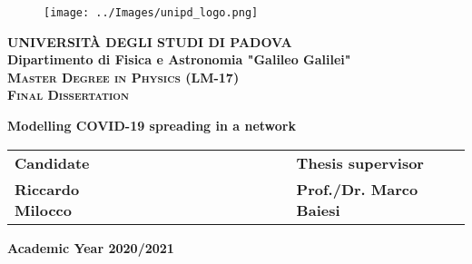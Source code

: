\documentclass[a4paper,11pt,twoside]{report} %
\makeatletter
\renewcommand\tableofcontents{%
    \section*{\Huge{\contentsname}}%
    \@starttoc{toc}%
}
\makeatother
\begin{document}

\begin{titlepage}
\vspace{5mm}
\begin{figure}[hbtp]
\centering
\texttt{[image: ../Images/unipd\_logo.png]}
\end{figure}
\vspace{5mm}
\begin{center}
{{\huge{\textsc{\bf UNIVERSIT\`A DEGLI STUDI DI PADOVA}}}\\}
\vspace{5mm}
{\Large{\bf Dipartimento di Fisica e Astronomia "Galileo Galilei"}} \\
\vspace{5mm}
{\Large{\textsc{\bf Master Degree in Physics (LM-17)}}}\\
\vspace{20mm}
{\Large{\textsc{\bf Final Dissertation}}}\\
\vspace{30mm}
\begin{spacing}{3}
{\LARGE \textbf{Modelling COVID-19 spreading in a network}}\\
\end{spacing}
\vspace{8mm}
\end{center}

\vspace{20mm}
\begin{spacing}{2}
\begin{tabular}{ l  c  c c c  cc c c c c  l }
{\Large{\bf Candidate}} &&&&&&&&&&& {\Large{\bf Thesis supervisor}}\\
{\Large{\bf Riccardo Milocco}} &&&&&&&&&&& {\Large{\bf Prof./Dr. Marco Baiesi}}\\
\end{tabular}
\end{spacing}
\vspace{15 mm}

\begin{center}
{\Large{\bf Academic Year 2020/2021}}
\end{center}
\end{titlepage}

\restoregeometry

\clearpage{\pagestyle{empty}\cleardoublepage}

\pagestyle{empty}

\vspace*{\fill}
\tableofcontents
\vspace*{\fill}
\end{document}
